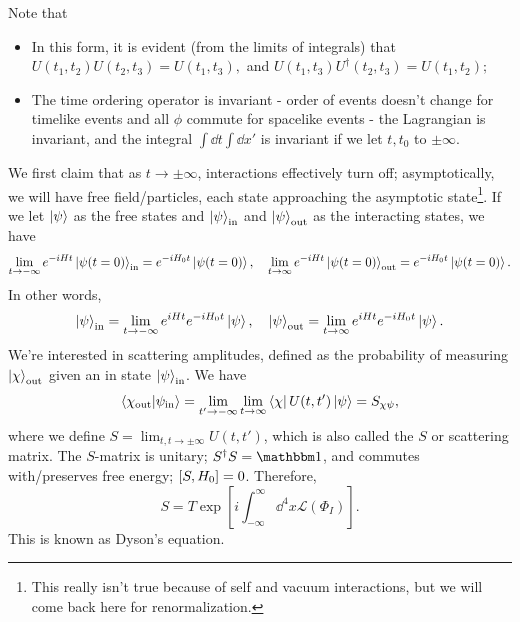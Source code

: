 \documentclass{article}
\begin{document}
Note that 
\begin{itemize}
    \item In this form, it is evident (from the limits of integrals) that $U(t_1,t_2)U(t_2,t_3)=U(t_1,t_3),$ and $U(t_1,t_3)U^\dag(t_2,t_3)=U(t_1,t_2);$
    \item The time ordering operator is invariant - order of events doesn't change for timelike events and all $\phi$ commute for spacelike events - the Lagrangian is invariant, and the integral $\int\dd t\int\dd x'$ is invariant if we let $t,t_0$ to $\pm\infty$.
\end{itemize}

We first claim that as $t\to\pm\infty$, interactions effectively turn off; asymptotically, we will have free field/particles, each state approaching the asymptotic state\footnote{This really isn't true because of self and vacuum interactions, but we will come back here for renormalization.}. If we let $\ket\psi$ as the free states and $\ket\psi_\text{in}$ and $\ket\psi_\text{out}$ as the interacting states, we have 
$$\lim_{t\to-\infty}e^{-iHt}\ket{\psi(t=0)}_\text{in}=e^{-iH_0t}\ket{\psi(t=0)},\quad \lim_{t\to\infty}e^{-iHt}\ket{\psi(t=0)}_\text{out}=e^{-iH_0t}\ket{\psi(t=0)}.$$
In other words, 
$$\ket\psi_\text{in}=\lim_{t\to-\infty}e^{iHt}e^{-iH_0t}\ket\psi,\quad\ket\psi_\text{out}=\lim_{t\to\infty}e^{iHt}e^{-iH_0t}\ket\psi.$$
We're interested in scattering amplitudes, defined as the probability of measuring $\ket\chi_\text{out}$ given an in state $\ket\psi_\text{in}$. We have 
$$\braket{\chi_\text{out}}{\psi_\text{in}}=\lim_{t'\to-\infty}\lim_{t\to\infty}\bra\chi U(t,t')\ket\psi=S_{\chi\psi},$$
where we define $S=\lim_{t,t\to\pm\infty}U(t,t')$, which is also called the $S$ or scattering matrix. The $S$-matrix is unitary; $S^\dag S=\mathbbm 1$, and commutes with/preserves free energy; $\comm{S}{H_0}=0$. Therefore, 
\begin{equation}
    S=T\exp\left[i\int^\infty_{-\infty}\dd^4x\mathcal L(\Phi_I)\right].
\end{equation}
This is known as Dyson's equation. 
\end{document}
